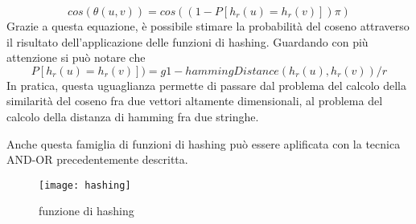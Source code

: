 \begin{equation}
cos(\theta(u,v))=cos((1-P[h_r(u)=h_r(v)])\pi)
\end{equation}
Grazie a questa equazione, è possibile stimare la probabilità del coseno attraverso il risultato dell'applicazione delle funzioni di hashing. Guardando con più attenzione si può notare che
\begin{equation*}
 P[h_r(u)=h_r(v)])=g1-hammingDistance(h_r(u),h_r(v))/r
\end{equation*}
In pratica, questa uguaglianza permette di passare dal problema del calcolo della similarità del coseno fra due vettori altamente dimensionali, al problema del calcolo della distanza di hamming fra due stringhe.

 Anche questa famiglia di funzioni di hashing può essere aplificata con la tecnica AND-OR precedentemente descritta.
\begin{figure}
    \centering
\texttt{[image: hashing]}
\caption{funzione di hashing}
\label{fig:hashingFunction}
\end{figure} 

 